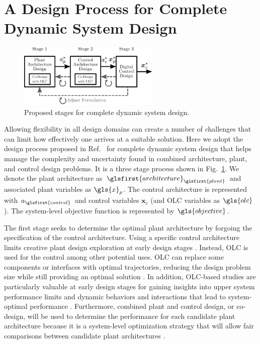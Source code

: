\section{A Design Process for Complete Dynamic System Design\label{sec:ch1:process}}

\begin{figure}
\centering
\includegraphics[width=0.6\textwidth]{../ch1/figures/stages2.pdf}
\caption{Proposed stages for complete dynamic system design.\label{fig:ch1:stages}}
\end{figure}

Allowing flexibility in all design domains can create a number of challenges that can limit how effectively one arrives at a suitable solution.
Here we adopt the design process proposed in Ref.~\cite{Deshmukh2015a} for complete dynamic system design that helps manage the complexity and uncertainty found in combined architecture, plant, and control design problems.
It is a three stage process shown in Fig.~\ref{fig:ch1:stages}.
We denote the plant architecture as $\glsfirst{architecture}_{\glsfirst{plant}}$ and associated plant variables as $\gls{x}_p$.
The control architecture is represented with $a_{\glsfirst{control}}$ and control variables $\bm{x}_c$ (and OLC variables as $\gls{olc}$).
The system-level objective function is represented by $\gls{objective}$.

The first stage seeks to determine the optimal plant architecture by forgoing the specification of the control architecture.
Using a specific control architecture limits creative plant design exploration at early design stages \cite{Deshmukh2015a}.
Instead, OLC is used for the control among other potential uses.
OLC can replace some components or interfaces with optimal trajectories, reducing the design problem size while still providing an optimal solution \cite{Deshmukh2015a, Herber2014a, Allison2014b}.
In addition, OLC-based studies are particularly valuable at early design stages for gaining insights into upper system performance limits and dynamic behaviors and interactions that lead to system-optimal performance \cite{Allison2014a, Allison2013d,Son2010a, Schaala1993a, Mourik2009a, Karkee2010a}.
Furthermore, combined plant and control design, or co-design, will be used to determine the performance for each candidate plant architecture because it is a system-level optimization strategy \cite{Herber2017b, Fathy2003a, Allison2014a} that will allow fair comparisons between candidate plant architectures \cite{Bayrak2015a}.

